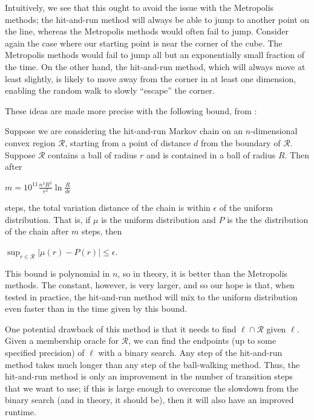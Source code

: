 \documentclass[11pt]{article}
\begin{document}
Intuitively, we see that this ought to avoid the issue with the Metropolis methods; the hit-and-run method will always be able to jump to another point on the line, whereas the Metropolis methods would often fail to jump. Consider again the case where our starting point is near the corner of the cube. The Metropolis methods would fail to jump all but an exponentially small fraction of the time. On the other hand, the hit-and-run method, which will always move at least slightly, is likely to move away from the corner in at least one dimension, enabling the random walk to slowly ``escape'' the corner.

These ideas are made more precise with the following bound, from \cite{Vempala}:

\begin{theorem} Suppose we are considering the hit-and-run Markov chain on an $n$-dimensional convex region $\mathcal{R}$, starting from a point of distance $d$ from the boundary of $\mathcal{R}$. Suppose $\mathcal{R}$ contains a ball of radius $r$ and is contained in a ball of radius $R$. Then after
\begin{center}$m = \displaystyle 10^{11}\frac{n^3 R^2}{r^2}\ln\frac{R}{d\epsilon}$\end{center}
steps, the total variation distance of the chain is within $\epsilon$ of the uniform distribution. That is, if $\mu$ is the uniform distribution and $P$ is the the distribution of the chain after $m$ steps, then
\begin{center}$\displaystyle \sup_{r \in \mathcal{R}} |\mu(r) - P(r)| \le \epsilon$.\end{center}
\end{theorem}

This bound is polynomial in $n$, so in theory, it is better than the Metropolis methods. The constant, however, is very larger, and so our hope is that, when tested in practice, the hit-and-run method will mix to the uniform distribution even faster than in the time given by this bound.

One potential drawback of this method is that it needs to find $\ell \cap \mathcal{R}$ given $\ell$. Given a membership oracle for $\mathcal{R}$, we can find the endpoints (up to some specified precision) of $\ell$ with a binary search. Any step of the hit-and-run method takes much longer than any step of the ball-walking method. Thus, the hit-and-run method is only an improvement in the number of transition steps that we want to use; if this is large enough to overcome the slowdown from the binary search (and in theory, it should be), then it will also have an improved runtime.
\end{document}
